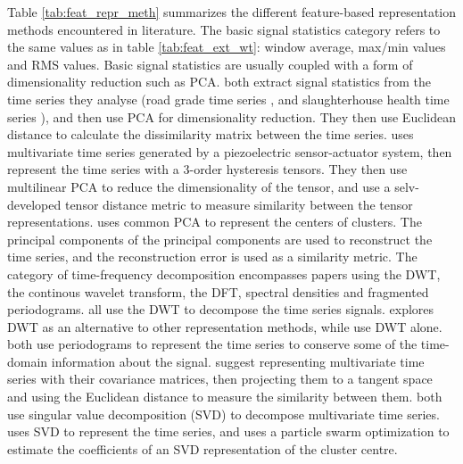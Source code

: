 Table \ref{tab:feat_repr_meth} summarizes the different feature-based representation methods encountered in literature. 
The basic signal statistics category refers to the same values as in table \ref{tab:feat_ext_wt}: window average, max/min values and RMS values.
Basic signal statistics are usually coupled with a form of dimensionality reduction such as PCA. 
\textcite{tsc_slaughterhouse, road_grade_china_pca_kmeans} both extract signal statistics from the time series they analyse (road grade time series \cite{road_grade_china_pca_kmeans}, and slaughterhouse health time series \cite{tsc_slaughterhouse}),
and then use PCA for dimensionality reduction. They then use Euclidean distance to calculate the dissimilarity matrix between the time series.
\textcite{hysteresis_tsc_tensor_decomp} uses multivariate time series generated by a piezoelectric sensor-actuator system, 
then represent the time series with a 3-order hysteresis tensors.
They then use multilinear PCA to reduce the dimensionality of the tensor, and use a selv-developed tensor distance metric to measure similarity between the tensor representations.
\textcite{multivariate_tsc_common_pca} uses common PCA to represent the centers of clusters.
The principal components of the principal components are used to reconstruct the time series, and the reconstruction error is used as a similarity metric.
The category of time-frequency decomposition encompasses papers using the DWT, the continous wavelet transform, the DFT, spectral densities and fragmented periodograms.
\textcite{shape_feat_mod_tsc_rfa, ambient_air_vape_k_means, dwt_hac_kmeans_som} all use the DWT to decompose the time series signals. 
\textcite{shape_feat_mod_tsc_rfa} explores DWT as an alternative to other representation methods, while \textcite{ambient_air_vape_k_means, dwt_hac_kmeans_som} use DWT alone.
\textcite{fragmented_periodogram, BSLEX_nonlin_nonstat_tsc} both use periodograms to represent the time series to conserve some of the time-domain information about the signal. 
\textcite{multivar_tsc_riemann_manifold} suggest representing multivariate time series with their covariance matrices, then projecting them to a tangent space and using the Euclidean distance to measure the similarity between them.
\textcite{fuzzy_c_means_pso_svd, svd_birch_tsc_stock_price} both use singular value decomposition (SVD) to decompose multivariate time series. 
\textcite{fuzzy_c_means_pso_svd} uses SVD to represent the time series, and uses a particle swarm optimization to estimate the coefficients of an SVD representation of the cluster centre.
